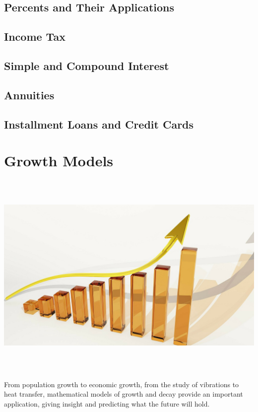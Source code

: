 \documentclass[9pt,letter,twoside,openright]{memoir}
\begin{document}
\section{Percents and Their Applications}


\section{Income Tax}


\section{Simple and Compound Interest}


\section{Annuities}

\vfill
\pagebreak

\section{Installment Loans and Credit Cards}


\chapter{Growth Models}
\begin{center}\includegraphics[width=\textwidth, height=4in]{Growth1}\end{center}
From population growth to economic growth, from the study of vibrations to heat transfer, mathematical models of growth and decay provide an important application, giving insight and predicting what the future will hold.
\end{document}
